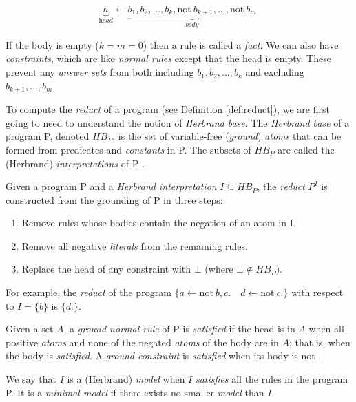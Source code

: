 \begin{equation}
\underbrace{h}_{\textit{head}} \leftarrow \underbrace{b_1, b_2, ..., b_k, \text{not}\ b_{k+1}, ..., \text{not}\ b_m}_{\textit{body}}.
\end{equation}

\noindent
If the body is empty ($k = m = 0$) then a rule is called a \textit{fact}. We can also have \textit{constraints}, which are like \textit{normal rules} except that the head is empty. These prevent any \textit{answer sets} from both including $b_1, b_2, ..., b_k$ and excluding $b_{k+1}, ..., b_m$.

To compute the \textit{reduct} of a program (see Definition \ref{def:reduct}), we are first going to need to understand the notion of \textit{Herbrand base}. The \textit{Herbrand base} of a program P, denoted $HB_P$, is the set of variable-free (\textit{ground}) \textit{atoms} that can be formed from predicates and \textit{constants} in P. The subsets of $HB_P$ are called the (Herbrand) \textit{interpretations} of P \cite{law_representing_2019}.

\begin{definition}
\label{def:reduct}
Given a program P and a \textit{Herbrand interpretation} $I \subseteq HB_P$, the \textit{reduct} $P^I$ is constructed from the grounding of P in three steps:
\begin{enumerate}[nolistsep]
\item Remove rules whose bodies contain the negation of an atom in I.
\item Remove all negative \textit{literals} from the remaining rules.
\item Replace the head of any constraint with $\bot$ (where $\bot \notin HB_P$).
\end{enumerate}
For example, the \textit{reduct} of the program $\{a \leftarrow \text{not}\ b, c.\quad d \leftarrow \text{not}\ c.\}$ with respect to $I=\{b\}$ is $\{d.\}$.
\end{definition}

\noindent
Given a set $A$, a \textit{ground normal rule} of P is \textit{satisfied} if the head is in $A$ when all positive \textit{atoms} and none of the negated \textit{atoms} of the body are in $A$; that is, when the body is \textit{satisfied}. A \textit{ground constraint} is \textit{satisfied} when its body is not \cite{law_representing_2019}.

\begin{definition}
We say that $I$ is a (Herbrand) \textit{model} when $I$ \textit{satisfies} all the rules in the program P. It is a \textit{minimal model} if there exists no smaller \textit{model} than $I$.
\end{definition}

